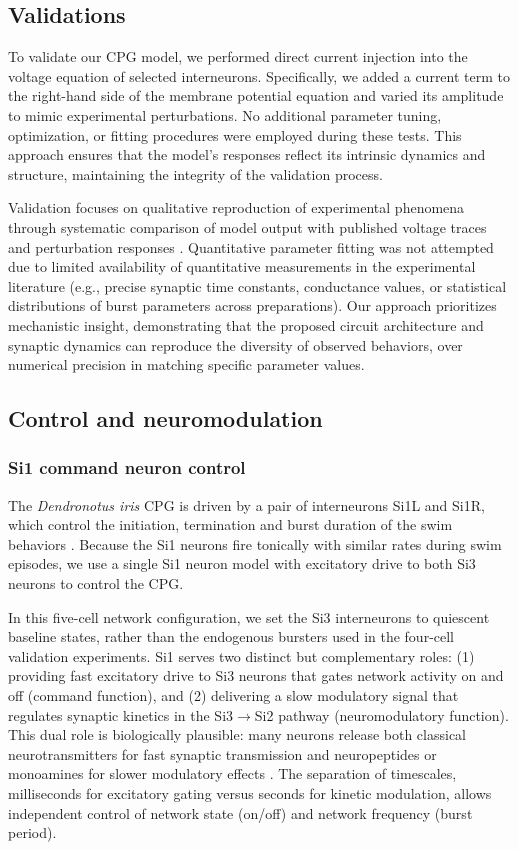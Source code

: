 \documentclass[nofootinbib,aip,amsmath,amssymb,preprint,twocolumn,floatfix,10pt]{revtex4-2}
\begin{document}
\subsection{Validations}
%
To validate our CPG model, we performed direct current injection into the voltage equation of selected interneurons. Specifically, we added a current term to the right-hand side of the membrane potential equation and varied its amplitude to mimic experimental perturbations. No additional parameter tuning, optimization, or fitting procedures were employed during these tests. This approach ensures that the model's responses reflect its intrinsic dynamics and structure, maintaining the integrity of the validation process.

Validation focuses on qualitative reproduction of experimental phenomena through systematic comparison of model output with published voltage traces and perturbation responses \cite{SakuraiKatz2016, sakurai2019command, sakurai2022bursting}. Quantitative parameter fitting was not attempted due to limited availability of quantitative measurements in the experimental literature (e.g., precise synaptic time constants, conductance values, or statistical distributions of burst parameters across preparations). Our approach prioritizes mechanistic insight, demonstrating that the proposed circuit architecture and synaptic dynamics can reproduce the diversity of observed behaviors, over numerical precision in matching specific parameter values.

\subsection{Control and neuromodulation}

\subsubsection{Si1 command neuron control}

The {\em Dendronotus iris} CPG is driven by a pair of interneurons Si1L and Si1R, which control the initiation, termination and burst duration of the swim behaviors \cite{sakurai2019command, SakuraiKatz2016}. Because the Si1 neurons fire tonically with similar rates during swim episodes, we use a single Si1 neuron model with excitatory drive to both Si3 neurons to control the CPG.

In this five-cell network configuration, we set the Si3 interneurons to quiescent baseline states, rather than the endogenous bursters used in the four-cell validation experiments. Si1 serves two distinct but complementary roles: (1) providing fast excitatory drive to Si3 neurons that gates network activity on and off (command function), and (2) delivering a slow modulatory signal that regulates synaptic kinetics in the Si3$\to$Si2 pathway (neuromodulatory function). This dual role is biologically plausible: many neurons release both classical neurotransmitters for fast synaptic transmission and neuropeptides or monoamines for slower modulatory effects \cite{MarderBucher2001, NadimBucher2014}. The separation of timescales, milliseconds for excitatory gating versus seconds for kinetic modulation, allows independent control of network state (on/off) and network frequency (burst period).
\end{document}
